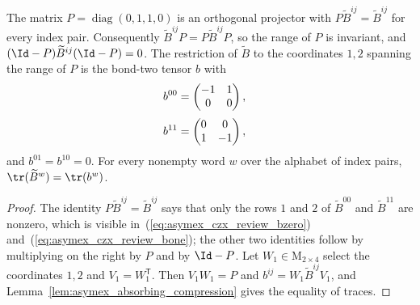 \begin{lemma}
    \label{thm:asymex_czx_review_first_step}
    \leanok
    The matrix $P=\operatorname{diag}(0,1,1,0)$ is an orthogonal projector
    with $P\widetilde B^{ij}=\widetilde B^{ij}$ for every index pair. Consequently
    $\widetilde B^{ij}P=P\widetilde B^{ij}P$, so the range of $P$ is invariant, and
    $(\Id-P)\widetilde B^{ij}(\Id-P)=0$. The restriction of $\widetilde B$ to the coordinates
    $1,2$ spanning the range of $P$ is the bond-two tensor $b$ with
    \begin{align}
        b^{00} & =\begin{pmatrix}-1&1\\0&0\end{pmatrix},
        \notag
    \end{align}
    \begin{align}
        b^{11} & =\begin{pmatrix}0&0\\1&-1\end{pmatrix},
        \notag
    \end{align}
    and $b^{01}=b^{10}=0$. For every nonempty word $w$ over the alphabet of
    index pairs, $\tr(\widetilde B^w)=\tr(b^w)$.
\end{lemma}

\begin{proof}
    \leanok
    The identity $P\widetilde B^{ij}=\widetilde B^{ij}$ says that only the rows $1$ and $2$ of
    $\widetilde B^{00}$ and $\widetilde B^{11}$ are nonzero, which is visible
    in~(\ref{eq:asymex_czx_review_bzero})
    and~(\ref{eq:asymex_czx_review_bone}); the other two identities follow
    by multiplying on the right by $P$ and by $\Id-P$. Let
    $W_1\in\mathrm{M}_{2\times4}$ select the coordinates $1,2$ and
    $V_1=W_1^{\mathsf T}$. Then $V_1W_1=P$ and $b^{ij}=W_1\widetilde B^{ij}V_1$, and
    Lemma~\ref{lem:asymex_absorbing_compression} gives the equality of
    traces.
\end{proof}

